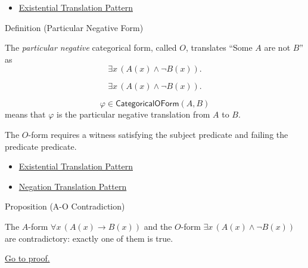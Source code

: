 \begin{dependencies}
\begin{itemize}
  \item \hyperref[prop:existential-translation-pattern]{Existential Translation Pattern}
\end{itemize}
\end{dependencies}

\begin{definitionbox}{Definition (Particular Negative Form)}
\begin{definition}
\label{def:categorical-o-form-predicate-logic}
The \emph{particular negative} categorical form, called \(O\), translates
``Some \(A\) are not \(B\)'' as
\[
\exists x\,(A(x)\land \neg B(x)).
\]
\end{definition}
\end{definitionbox}

\begin{remark*}
\[
\exists x\,(A(x)\land \neg B(x)).
\]
\end{remark*}

\begin{remark*}
\[
  \varphi\in\mathsf{CategoricalOForm}(A,B)
\] means that \(\varphi\) is the
particular negative translation from \(A\) to \(B\).
\end{remark*}

\begin{remark*}[Interpretation]
The \(O\)-form requires a witness satisfying the subject predicate and failing
the predicate predicate.
\end{remark*}

\begin{dependencies}
\begin{itemize}
  \item \hyperref[prop:existential-translation-pattern]{Existential Translation Pattern}
  \item \hyperref[prop:negation-translation-pattern]{Negation Translation Pattern}
\end{itemize}
\end{dependencies}

\begin{propositionbox}{Proposition (A-O Contradiction)}
\begin{proposition}[A-O Contradiction]
\label{prop:a-o-contradictory-predicate-logic}
The \(A\)-form \(\forall x\,(A(x)\to B(x))\) and the \(O\)-form
\(\exists x\,(A(x)\land \neg B(x))\) are contradictory: exactly one of them is
true.

\noindent\hyperref[prf:a-o-contradictory-predicate-logic]{Go to proof.}
\end{proposition}
\end{propositionbox}

